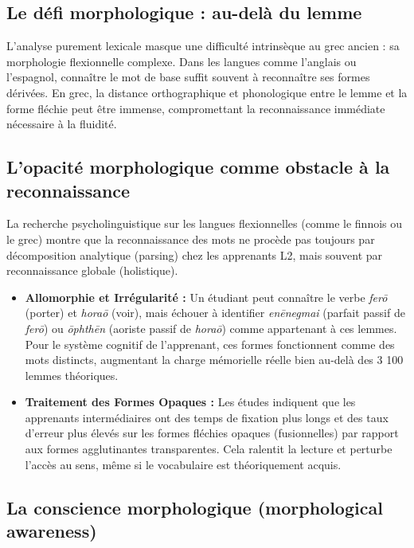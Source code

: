 {{\subsection{Le défi morphologique : au-delà du lemme}

L'analyse purement lexicale masque une difficulté intrinsèque au grec ancien : sa morphologie
flexionnelle complexe. Dans les langues comme l'anglais ou l'espagnol, connaître le mot de base
suffit souvent à reconnaître ses formes dérivées. En grec, la distance orthographique et
phonologique entre le lemme et la forme fléchie peut être immense, compromettant la reconnaissance
immédiate nécessaire à la fluidité.



\subsection{L'opacité morphologique comme obstacle à la reconnaissance}

La recherche psycholinguistique sur les langues flexionnelles (comme le finnois ou le grec) montre
que la reconnaissance des mots ne procède pas toujours par décomposition analytique (parsing) chez
les apprenants L2, mais souvent par reconnaissance globale (holistique).\cite{III-1-2-ref31}

\begin{itemize}\item \textbf{Allomorphie et Irrégularité :} Un étudiant peut connaître le verbe \textit{ferō} (porter) et \textit{horaō} (voir), mais échouer à identifier \textit{enēnegmai} (parfait passif de \textit{ferō}) ou \textit{ōphthēn} (aoriste passif de \textit{horaō}) comme appartenant à ces lemmes. Pour le système cognitif de l'apprenant, ces formes fonctionnent comme des mots distincts, augmentant la charge mémorielle réelle bien au-delà des 3 100 lemmes théoriques.\cite{III-1-2-ref5}\item \textbf{Traitement des Formes Opaques :} Les études indiquent que les apprenants intermédiaires ont des temps de fixation plus longs et des taux d'erreur plus élevés sur les formes fléchies opaques (fusionnelles) par rapport aux formes agglutinantes transparentes.\cite{III-1-2-ref31} Cela ralentit la lecture et perturbe l'accès au sens, même si le \og vocabulaire\fg{} est théoriquement acquis.\end{itemize}

\subsection{La conscience morphologique (morphological awareness)}

}}
